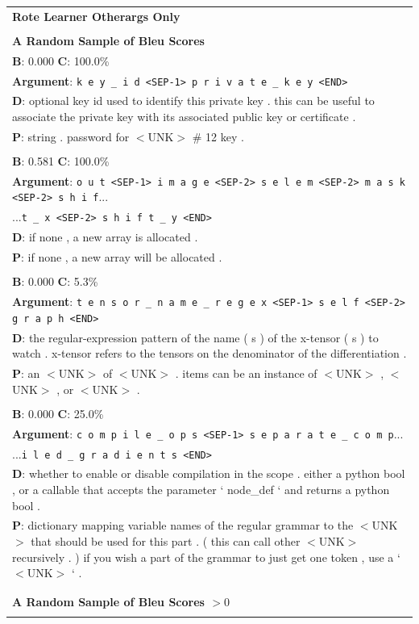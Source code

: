 \begin{table}
\begin{center}
\begin{tabular}{l}


\hline
\textbf{Rote Learner Otherargs Only}\\
\\
\textbf{A Random Sample of Bleu Scores  } \\

 
\textbf{B}: 0.000
\textbf{C}: 100.0\%  \\
\textbf{Argument}: \texttt{k e y _ i d <SEP-1> p r i v a t e _ k e y <END>}\\
\textbf{D}: optional key id used to identify this private key . this can be useful to associate the private key with its associated public key or certificate .\\
\textbf{P}: string . password for $<$UNK$>$ \# 12 key . \\
\\
\textbf{B}: 0.581
\textbf{C}: 100.0\%  \\
\textbf{Argument}: \texttt{o u t <SEP-1> i m a g e <SEP-2> s e l e m <SEP-2> m a s k <SEP-2> s h i f}...\\
...\texttt{t _ x <SEP-2> s h i f t _ y <END>}\\
\textbf{D}: if none , a new array is allocated .\\
\textbf{P}: if none , a new array will be allocated . \\
\\
\textbf{B}: 0.000
\textbf{C}: 5.3\%  \\
\textbf{Argument}: \texttt{t e n s o r _ n a m e _ r e g e x <SEP-1> s e l f <SEP-2> g r a p h <END>}\\
\textbf{D}: the regular-expression pattern of the name ( s ) of the x-tensor ( s ) to watch . x-tensor refers to the tensors on the denominator of the differentiation .\\
\textbf{P}: an $<$UNK$>$ of $<$UNK$>$ . items can be an instance of $<$UNK$>$ , $<$UNK$>$ , or $<$UNK$>$ . \\
\\
\textbf{B}: 0.000
\textbf{C}: 25.0\%  \\
\textbf{Argument}: \texttt{c o m p i l e _ o p s <SEP-1> s e p a r a t e _ c o m p}...\\
...\texttt{i l e d _ g r a d i e n t s <END>}\\
\textbf{D}: whether to enable or disable compilation in the scope . either a python bool , or a callable that accepts the parameter ` node\_def ` and returns a python bool .\\
\textbf{P}: dictionary mapping variable names of the regular grammar to the $<$UNK$>$ that should be used for this part . ( this can call other $<$UNK$>$ recursively . ) if you wish a part of the grammar to just get one token , use a ` $<$UNK$>$ ` . \\
\\
\hline\\
\textbf{A Random Sample of Bleu Scores $>0$  }\\
\\


\end{tabular}
\end{center}
\end{table}

